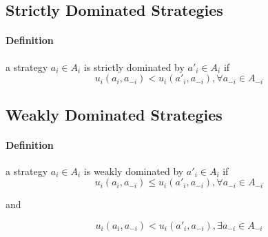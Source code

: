 \subsection{Strictly Dominated Strategies}
\paragraph{Definition}a strategy $a_i \in A_i $ is strictly dominated by $a'_i \in A_i$ if
\begin{equation} u_i(a_i, a_{-i}) < u_i(a'_i, a_{-i}) ,  \forall   a_{-i} \in A_{-i} \end{equation}
\subsection{Weakly Dominated Strategies}
\paragraph{Definition}a strategy $a_i \in A_i $ is weakly dominated by $a'_i \in A_i$ if
\begin{equation} u_i(a_i, a_{-i}) \leq u_i(a'_i, a_{-i}) ,  \forall   a_{-i} \in A_{-i} \end{equation}
\begin{center}
and 
\end{center}

\begin{equation} u_i(a_i, a_{-i}) < u_i(a'_i, a_{-i}) ,\exists   a_{-i} \in A_{-i} \end{equation} 
